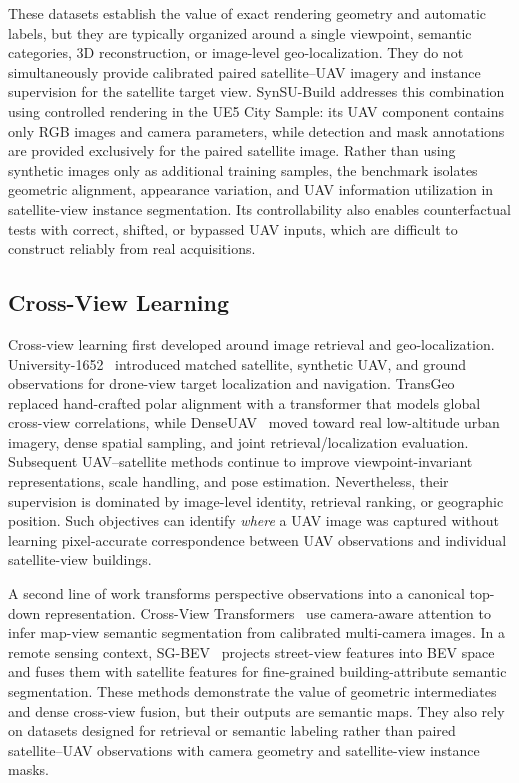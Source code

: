 \documentclass[letterpaper,journal]{IEEEtran}
\begin{document}
These datasets establish the value of exact rendering geometry and automatic labels, but they are typically organized around a single viewpoint, semantic categories, 3D reconstruction, or image-level geo-localization. They do not simultaneously provide calibrated paired satellite--UAV imagery and instance supervision for the satellite target view. SynSU-Build addresses this combination using controlled rendering in the UE5 City Sample: its UAV component contains only RGB images and camera parameters, while detection and mask annotations are provided exclusively for the paired satellite image. Rather than using synthetic images only as additional training samples, the benchmark isolates geometric alignment, appearance variation, and UAV information utilization in satellite-view instance segmentation. Its controllability also enables counterfactual tests with correct, shifted, or bypassed UAV inputs, which are difficult to construct reliably from real acquisitions.

\subsection{Cross-View Learning}
Cross-view learning first developed around image retrieval and geo-localization. University-1652~\cite{ref_university} introduced matched satellite, synthetic UAV, and ground observations for drone-view target localization and navigation. TransGeo~\cite{ref_transgeo} replaced hand-crafted polar alignment with a transformer that models global cross-view correlations, while DenseUAV~\cite{ref_denseuav} moved toward real low-altitude urban imagery, dense spatial sampling, and joint retrieval/localization evaluation. Subsequent UAV--satellite methods continue to improve viewpoint-invariant representations, scale handling, and pose estimation. Nevertheless, their supervision is dominated by image-level identity, retrieval ranking, or geographic position. Such objectives can identify \emph{where} a UAV image was captured without learning pixel-accurate correspondence between UAV observations and individual satellite-view buildings.

A second line of work transforms perspective observations into a canonical top-down representation. Cross-View Transformers~\cite{ref_cvt} use camera-aware attention to infer map-view semantic segmentation from calibrated multi-camera images. In a remote sensing context, SG-BEV~\cite{ref_sgbeyv} projects street-view features into BEV space and fuses them with satellite features for fine-grained building-attribute semantic segmentation. These methods demonstrate the value of geometric intermediates and dense cross-view fusion, but their outputs are semantic maps. They also rely on datasets designed for retrieval or semantic labeling rather than paired satellite--UAV observations with camera geometry and satellite-view instance masks.
\end{document}
